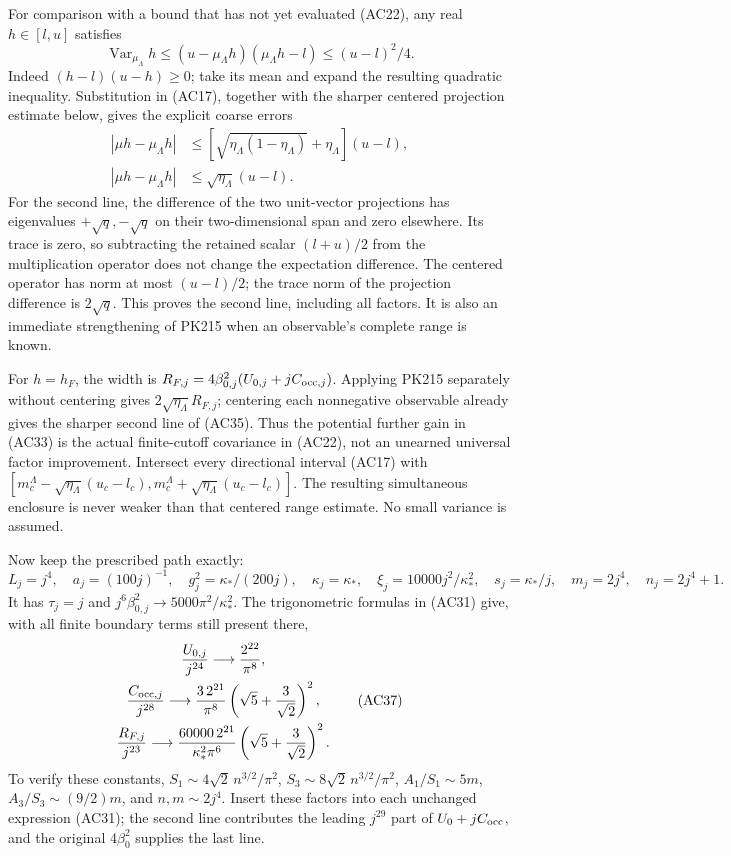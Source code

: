 \documentclass[11pt]{article}
\begin{document}
For comparison with a bound that has not yet evaluated (AC22), any real \(h\in[l,u]\) satisfies
\[
 \operatorname{Var}_{\mu_\Lambda}h
 \le(u-\mu_\Lambda h)(\mu_\Lambda h-l)\le(u-l)^2/4.
 \tag{AC34}
\]
Indeed \((h-l)(u-h)\ge0\); take its mean and expand the resulting quadratic inequality. Substitution in (AC17), together with the sharper centered projection estimate below, gives the explicit coarse errors
\[
 \begin{aligned}
 |\mu h-\mu_\Lambda h|
 &\le[\sqrt{\eta_\Lambda(1-\eta_\Lambda)}+\eta_\Lambda](u-l),\\
 |\mu h-\mu_\Lambda h|&\le\sqrt{\eta_\Lambda}(u-l).
 \end{aligned}
 \tag{AC35}
\]
For the second line, the difference of the two unit-vector projections has eigenvalues \(+\sqrt q,-\sqrt q\) on their two-dimensional span and zero elsewhere. Its trace is zero, so subtracting the retained scalar \((l+u)/2\) from the multiplication operator does not change the expectation difference. The centered operator has norm at most \((u-l)/2\); the trace norm of the projection difference is \(2\sqrt q\). This proves the second line, including all factors. It is also an immediate strengthening of PK215 when an observable's complete range is known.

For \(h=h_F\), the width is
\(R_{F,j}=4\beta_{0,j}^2(U_{0,j}+jC_{{\rm occ},j})\).
Applying PK215 separately without centering gives \(2\sqrt{\eta_\Lambda}R_{F,j}\); centering each nonnegative observable already gives the sharper second line of (AC35). Thus the potential further gain in (AC33) is the actual finite-cutoff covariance in (AC22), not an unearned universal factor improvement. Intersect every directional interval (AC17) with \([m_c^\Lambda-\sqrt{\eta_\Lambda}(u_c-l_c),m_c^\Lambda+\sqrt{\eta_\Lambda}(u_c-l_c)]\). The resulting simultaneous enclosure is never weaker than that centered range estimate. No small variance is assumed.

Now keep the prescribed path exactly:
\[
 L_j=j^4,\quad a_j=(100j)^{-1},\quad
 g_j^2=\kappa_*/(200j),\quad
 \kappa_j=\kappa_*,\quad\xi_j=10000j^2/\kappa_*^2,\quad
 s_j=\kappa_*/j,\quad m_j=2j^4,\quad n_j=2j^4+1 .
 \tag{AC36}
\]
It has \(\tau_j=j\) and \(j^6\beta_{0,j}^2\to5000\pi^2/\kappa_*^2\). The trigonometric formulas in (AC31) give, with all finite boundary terms still present there,
\[
 \begin{gathered}
 \frac{U_{0,j}}{j^{24}}\longrightarrow\frac{2^{22}}{\pi^8},\\
 \frac{C_{{\rm occ},j}}{j^{28}}
 \longrightarrow\frac{3\,2^{21}}{\pi^8}
                  \left(\sqrt5+\frac3{\sqrt2}\right)^2,\\
 \frac{R_{F,j}}{j^{23}}
 \longrightarrow
 \frac{60000\,2^{21}}{\kappa_*^2\pi^6}
                  \left(\sqrt5+\frac3{\sqrt2}\right)^2 .
 \end{gathered}\tag{AC37}
\]
To verify these constants, \(S_1\sim4\sqrt2\,n^{3/2}/\pi^2\), \(S_3\sim8\sqrt2\,n^{3/2}/\pi^2\), \(A_1/S_1\sim5m\), \(A_3/S_3\sim(9/2)m\), and \(n,m\sim2j^4\). Insert these factors into each unchanged expression (AC31); the second line contributes the leading \(j^{29}\) part of \(U_0+jC_{\rm occ}\), and the original \(4\beta_0^2\) supplies the last line.
\end{document}
